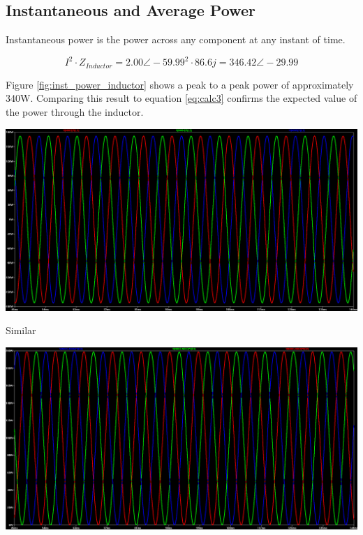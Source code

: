 \documentclass[journal]{IEEEtran}
\begin{document}
\subsection{Instantaneous and Average Power}
Instantaneous power is the power across any component at any instant of time. 

\begin{equation} 
I^2 \cdot Z_{Inductor} = {2.00 \angle -59.99}^2 \cdot 86.6j = 346.42 \angle -29.99  
\label{eq:calc3}
\end{equation}

Figure \ref{fig:inst_power_inductor} shows a peak to a peak power of approximately 340W. Comparing this result to equation \ref{eq:calc3} confirms the expected value of the power through the inductor.

\begingroup
    \centering
    \medskip
    \includegraphics[width=\columnwidth]{images/Lab_9_ss_12.PNG}
    \label{fig:inst_power_inductor}
    \medskip
\endgroup

Similar



\begingroup
    \centering
    \medskip
    \includegraphics[width=\columnwidth]{images/Lab_9_ss_13.PNG}
    \label{fig:circ3}
    \medskip
\endgroup
\end{document}
